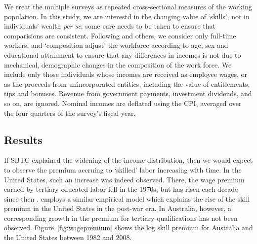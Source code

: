 We treat the multiple surveys as repeated cross-sectional measures of the working population. In this study, we are interestd in the changing value of `skills', not in individuals' wealth {\em per se}: some care needs to be taken to ensure that comparisions are consistent. Following \citet{Acemoglu2011} and others, we consider only full-time workers, and `composition adjust' the workforce according to age, sex and educational attainment to ensure that any differences in incomes is not due to mechanical, demographic changes in the composition of the work force. We include only those individuals whose incomes are received as employee wages, or as the proceeds from unincorporated entities, including the value of entitlements, tips and bonuses. Revenue from government payments, investment dividends, and so on, are ignored. Nominal incomes are deflated using the CPI, averaged over the four quarters of the survey's fiscal year.

\subsection{Results}

If SBTC explained the widening of the income distribution, then we would expect to observe the premium accruing to `skilled' labor increasing with time. In the United States, such an increase was indeed observed. There, the wage premium earned by tertiary-educated labor fell in the 1970s, but has risen each decade since then \citep{Acemoglu2011}. \citet{Katz1992} employs a similar empirical model which explains the rise of the skill premium in the United States in the post-war era. In Australia, however, a corresponding growth in the premium for tertiary qualifications has not been observed. Figure~\ref{fig:wagepremium} shows the log skill premium for Australia and the United States between 1982 and 2008.

